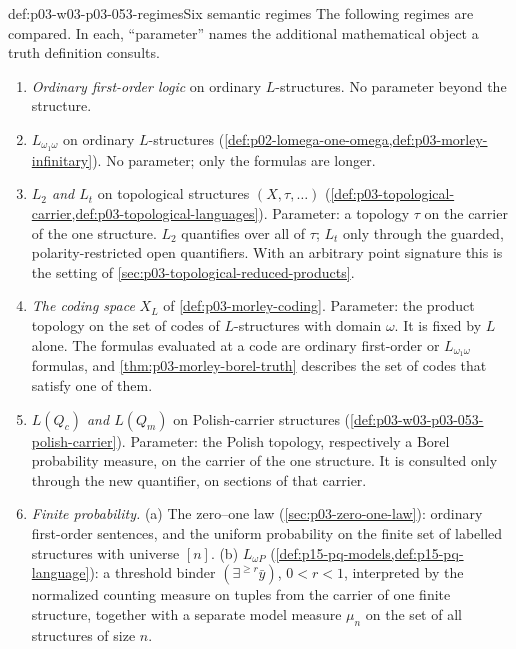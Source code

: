 \begin{hbdefinition}{def:p03-w03-p03-053-regimes}{Six semantic regimes}
The following regimes are compared. In each, ``parameter'' names the
additional mathematical object a truth definition consults.
\begin{enumerate}
\item[(R1)] \emph{Ordinary first-order logic} on ordinary
  \(L\)-structures. No parameter beyond the structure.
\item[(R2)] \emph{\(L_{\omega_1\omega}\)} on ordinary \(L\)-structures
  (\cref{def:p02-lomega-one-omega,def:p03-morley-infinitary}).
  No parameter; only the formulas are longer.
\item[(R3)] \emph{\(L_2\) and \(L_t\)} on topological structures
  \((X,\tau,\ldots)\)
  (\cref{def:p03-topological-carrier,def:p03-topological-languages}).
  Parameter: a topology \(\tau\) on the carrier of the one structure.
  \(L_2\) quantifies over all of \(\tau\); \(L_t\) only through the
  guarded, polarity-restricted open quantifiers. With an arbitrary point
  signature this is the setting of
  \cref{sec:p03-topological-reduced-products}.
\item[(R4)] \emph{The coding space} \(X_L\) of
  \cref{def:p03-morley-coding}. Parameter: the product topology on the
  set of codes of \(L\)-structures with domain \(\omega\). It is fixed by
  \(L\) alone. The formulas evaluated at a code are ordinary
  first-order or \(L_{\omega_1\omega}\) formulas, and
  \cref{thm:p03-morley-borel-truth} describes the set of codes that
  satisfy one of them.
\item[(R5)] \emph{\(L(Q_c)\) and \(L(Q_m)\)} on Polish-carrier
  structures (\cref{def:p03-w03-p03-053-polish-carrier}).
  Parameter: the Polish topology, respectively a Borel probability
  measure, on the carrier of the one structure. It is consulted only
  through the new quantifier, on sections of that carrier.
\item[(R6)] \emph{Finite probability.} (a) The zero--one law
  (\cref{sec:p03-zero-one-law}): ordinary first-order sentences, and the
  uniform probability on the finite set of labelled structures with
  universe \([n]\). (b) \(L_{\omega P}\)
  (\cref{def:p15-pq-models,def:p15-pq-language}): a threshold binder
  \((\exists^{\ge r}\bar y)\), \(0<r<1\), interpreted by the
  normalized counting measure on tuples from the carrier of one finite
  structure, together with a separate model measure \(\mu_n\) on the
  set of all structures of size \(n\).
\end{enumerate}
\end{hbdefinition}


